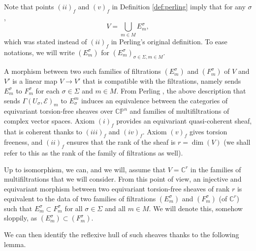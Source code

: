\documentclass[a4paper,10pt]{amsart}
\theoremstyle{plain}{
    \newtheorem{theorem}{Theorem}[section]
    \newtheorem{lemma}[theorem]{Lemma}
    \newtheorem{corollary}[theorem]{Corollary}
    \newtheorem{proposition}[theorem]{Proposition}
    \newtheorem{conjecture}[theorem]{Conjecture}
}
\theoremstyle{definition}{
    \newtheorem{definition}[theorem]{Definition}
    \newtheorem{defn-thm}[theorem]{Definition-Theorem}
    \newtheorem{example}[theorem]{Example}
    \newtheorem{notation}[theorem]{Notation}
}
\theoremstyle{remark}{
    \newtheorem{remark}[theorem]{Remark}
    \newtheorem{problem}[theorem]{Problem}
    \newtheorem{question}[theorem]{Question}
}
\def\cE{\mathcal{E}}
\def\P{\mathbb{P}}
\def\C{\mathbb{C}}
\begin{document}
Note that points $(ii)_f$ and $(v)_f$ in Definition \ref{def:perling} imply that for any $\sigma$,
\begin{equation}
 \label{eq:union is V}
\displaystyle V=\bigcup_{m\in M} E^\sigma_m,
\end{equation}
which was stated instead of $(ii)_f$ in Perling's original definition. To ease notations, we will write $(E^\sigma_m)$ for $(E^\sigma_m)_{\sigma\in \Sigma, m\in M}$.

A morphism between two such families of filtrations $(E^\sigma_m)$ and $(F^\sigma_m)$ of $V$ and $V'$ is a linear map $V\to V'$ that is compatible with the filtrations, namely sends $E^\sigma_m$ to $F^\sigma_m$ for each $\sigma\in\Sigma$ and $m\in M$. From Perling \cite[Theorem 5.18]{Per04}, the above description that sends $\Gamma(U_\sigma,\cE)_m$ to $E_\sigma^m$ induces an equivalence between the categories of equivariant torsion-free sheaves over $\C\P^n$ and families of multifiltrations of complex vector spaces. Axiom $(i)_f$ provides an equivariant quasi-coherent sheaf, that is coherent thanks to $(iii)_f$ and $(iv)_f$. Axiom $(v)_f$ gives torsion freeness, and $(ii)_f$ ensures that the rank of the sheaf is $r=\dim(V)$ (we shall refer to this as the rank of the family of filtrations as well).

Up to isomorphism, we can, and we will, assume that $V=\C^r$ in the families of multifiltrations that we will consider. From this point of view, an injective and equivariant morphism between two equivariant torsion-free sheaves of rank $r$ is equivalent to the data of two families of filtrations $(E^\sigma_m)$ and $(F^\sigma_m)$ (of $\C^r$) such that $E^\sigma_m\subset F^\sigma_m$ for all $\sigma\in\Sigma$ and all $m\in M$. We will denote this, somehow sloppily, as $(E^\sigma_m)\subset(F^\sigma_m)$.


We can then identify the reflexive hull of such sheaves thanks to the following lemma.
\end{document}
